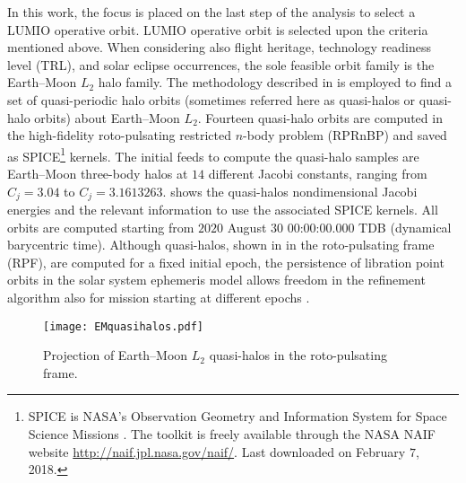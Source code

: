 In this work, the focus is placed on the last step of the analysis to select a LUMIO operative orbit. LUMIO operative orbit is selected upon the criteria mentioned above. When considering also flight heritage, \eg technology readiness level (TRL), and solar eclipse occurrences, the sole feasible orbit family is the Earth--Moon $L_2$ halo family. The methodology described in \cite{deitos2017asr} is employed to find a set of quasi-periodic halo orbits (sometimes referred here as quasi-halos or quasi-halo orbits) about Earth--Moon $L_2$. Fourteen quasi-halo orbits are computed in the high-fidelity roto-pulsating restricted $n$-body problem (RPRnBP) and saved as SPICE\footnote{SPICE is NASA's Observation Geometry and Information System for Space Science Missions \cite{acton1996ancillary,acton2018look}. The toolkit is freely available through the NASA NAIF website \url{http://naif.jpl.nasa.gov/naif/}. Last downloaded on February $7$, 2018.} kernels. The initial feeds to compute the quasi-halo samples are Earth--Moon three-body halos at $14$ different Jacobi constants, ranging from $C_j = 3.04$ to $C_j = 3.1613263$.  shows the quasi-halos nondimensional Jacobi energies and the relevant information to use the associated SPICE kernels. All orbits are computed starting from $2020$ August $30$ $00$:$00$:$00.000$ TDB (dynamical barycentric time). Although quasi-halos, shown in  in the roto-pulsating frame (RPF), are computed for a fixed initial epoch, the persistence of libration point orbits in the solar system ephemeris model allows freedom in the refinement algorithm also for mission starting at different epochs \cite{deitos2017asr}.
%
\begin{figure*}[t!]
	\centering
	\texttt{[image: EMquasihalos.pdf]}
	\caption{Projection of Earth--Moon $L_2$ quasi-halos in the roto-pulsating frame.}
	\label{fig:EMquasihalos}
\end{figure*}
%

